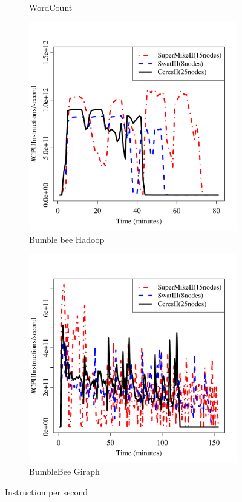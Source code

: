 \documentclass[journal]{IEEEtran}
\begin{document}
\begin{figure}[htb]
\begin{subfigure}[b]{0.24\textwidth}
                \caption{WordCount}
                \label{fig:WordCountIPS}
   \end{subfigure}
   \begin{subfigure}[b]{0.24\textwidth}
                \includegraphics[width=\textwidth]{Figures/SystemFigures/BombusGrConsIPS.pdf}
                \caption{Bumble bee Hadoop}
                \label{fig:BombusGrConsIPS}
    \end{subfigure}
 	\begin{subfigure}[b]{0.24\textwidth}
                \includegraphics[width=\textwidth]{Figures/SystemFigures/BombusGrSimpIPS.pdf}
                \caption{BumbleBee Giraph}
                \label{fig:BombusGrSimpIPS}
   \end{subfigure}
   \caption{Instruction per second}
  \label{fig:IPS}
\end{figure}
\end{document}
